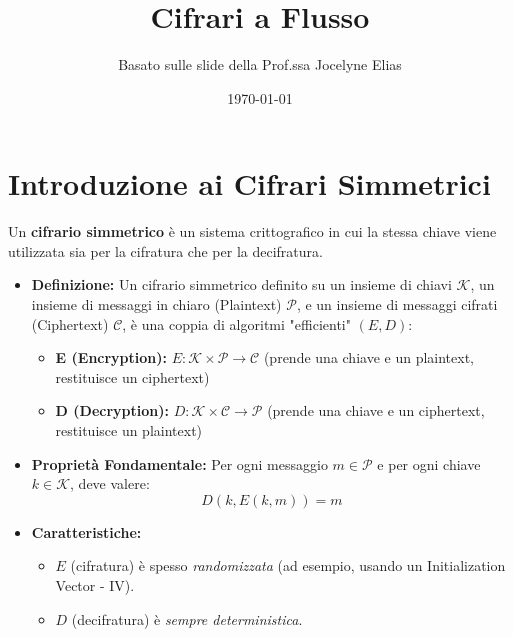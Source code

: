

\title{Cifrari a Flusso}
\author{Basato sulle slide della Prof.ssa Jocelyne Elias}
\date{\today}



\maketitle
\tableofcontents
\newpage

\section{Introduzione ai Cifrari Simmetrici}

Un \textbf{cifrario simmetrico} è un sistema crittografico in cui la stessa chiave viene utilizzata sia per la cifratura che per la decifratura.

\begin{itemize}
    \item \textbf{Definizione:} Un cifrario simmetrico definito su un insieme di chiavi $\mathcal{K}$, un insieme di messaggi in chiaro (Plaintext) $\mathcal{P}$, e un insieme di messaggi cifrati (Ciphertext) $\mathcal{C}$, è una coppia di algoritmi "efficienti" $(E, D)$:
    \begin{itemize}
        \item \textbf{E (Encryption):} $E: \mathcal{K} \times \mathcal{P} \to \mathcal{C}$ (prende una chiave e un plaintext, restituisce un ciphertext)
        \item \textbf{D (Decryption):} $D: \mathcal{K} \times \mathcal{C} \to \mathcal{P}$ (prende una chiave e un ciphertext, restituisce un plaintext)
    \end{itemize}
    \item \textbf{Proprietà Fondamentale:} Per ogni messaggio $m \in \mathcal{P}$ e per ogni chiave $k \in \mathcal{K}$, deve valere:
    \[ D(k, E(k,m)) = m \]
    \item \textbf{Caratteristiche:}
    \begin{itemize}
        \item $E$ (cifratura) è spesso \textit{randomizzata} (ad esempio, usando un Initialization Vector - IV).
        \item $D$ (decifratura) è \textit{sempre deterministica}.
    \end{itemize}
\end{itemize}

